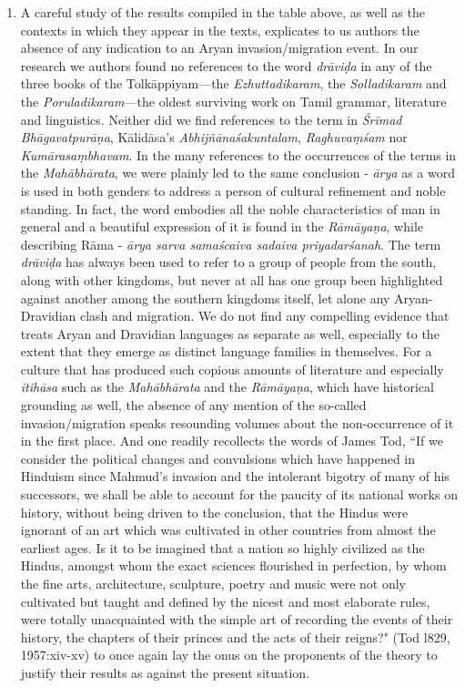 \begin{enumerate}
\item A careful study of the results compiled in the table above, as well as the contexts in which they appear in the texts, explicates to us authors the absence of any indication to an Aryan invasion/migration event. In our research we authors found no references to the word \textit{drāviḍa} in any of the three books of the Tolkāppiyam—the \textit{Ezhuttadikaram}, the \textit{Solladikaram} and the \textit{Poruladikaram}—the oldest surviving work on Tamil grammar, literature and linguistics. Neither did we find references to the term in \textit{Śrīmad Bhāgavatpurāṇa}, Kālidāsa’s \textit{Abhijñānaśakuntalam}, \textit{Raghuvaṃśam} nor \textit{Kumārasaṃbhavam}. In the many references to the occurrences of the terms in the \textit{Mahābhārata}, we were plainly led to the same conclusion - \textit{ārya} as a word is used in both genders to address a person of cultural refinement and noble standing. In fact, the word embodies all the noble characteristics of man in general and a beautiful expression of it is found in the \textit{Rāmāyaṇa}, while describing Rāma -\textit{ ārya sarva samaścaiva sadaiva priyadarśanah}. The term \textit{drāviḍa} has always been used to refer to a group of people from the south, along with other kingdoms, but never at all has one group been highlighted against another among the southern kingdoms itself, let alone any Aryan-Dravidian clash and migration. We do not find any compelling evidence that treats Aryan and Dravidian languages as separate as well, especially to the extent that they emerge as distinct language families in themselves. For a culture that has produced such copious amounts of literature and especially \textit{itihāsa} such as the \textit{Mahābhārata} and the \textit{Rāmāyaṇa}, which have historical grounding as well, the absence of any mention of the so-called invasion/migration speaks resounding volumes about the non-occurrence of it in the first place. And one readily recollects the words of James Tod, “If we consider the political changes and convulsions which have happened in Hinduism since Mahmud's invasion and the intolerant bigotry of many of his successors, we shall be able to account for the paucity of its national works on history, without being driven to the conclusion, that the Hindus were ignorant of an art which was cultivated in other countries from almost the earliest ages. Is it to be imagined that a nation so highly civilized as the Hindus, amongst whom the exact sciences flourished in perfection, by whom the fine arts, architecture, sculpture, poetry and music were not only cultivated but taught and defined by the nicest and most elaborate rules, were totally unacquainted with the simple art of recording the events of their history, the chapters of their princes and the acts of their reigns?" (Tod l829, 1957:xiv-xv) to once again lay the onus on the proponents of the theory to justify their results as against the present situation. 


\end{enumerate}
